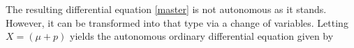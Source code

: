 \documentclass[abstract=on,notitlepage,superscriptaddress,nofootinbib,aps,preprint,prd]{revtex4}
\newcommand{\0}{^{(0)}}
\newcommand{\1}{^{(1)}}
\newcommand{\2}{^{(2)}}
\newcommand{\3}{{}^{(3)}}
\begin{document}
The resulting differential equation \eqref{master} is not autonomous as it stands. However, it can be transformed into that type via a change of variables. Letting $X=(\mu+p)$ yields the autonomous ordinary differential equation given by
\end{document}

